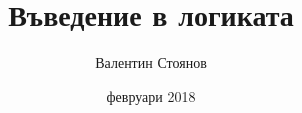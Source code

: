 \documentclass[12pt]{article}
\begin{document}
\title{Въведение в логиката}
\author{Валентин Стоянов}
\date{февруари 2018}
\maketitle

\section{}
\end{document}
